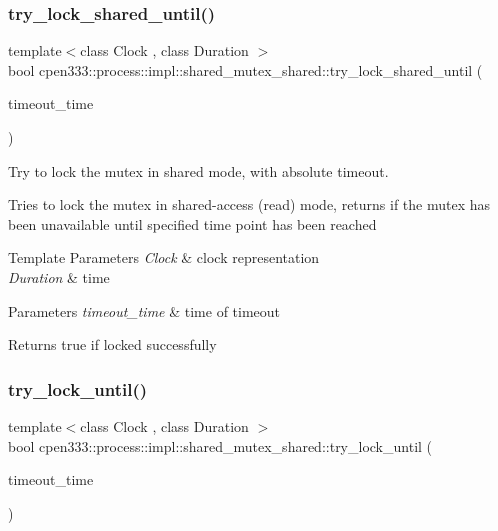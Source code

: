 \subsubsection{\texorpdfstring{try\+\_\+lock\+\_\+shared\+\_\+until()}{try\_lock\_shared\_until()}}
{\footnotesize\ttfamily template$<$class Clock , class Duration $>$ \\
bool cpen333\+::process\+::impl\+::shared\+\_\+mutex\+\_\+shared\+::try\+\_\+lock\+\_\+shared\+\_\+until (\begin{DoxyParamCaption}\item[{const std\+::chrono\+::time\+\_\+point$<$ Clock, Duration $>$ \&}]{timeout\+\_\+time }\end{DoxyParamCaption})\hspace{0.3cm}{\ttfamily [inline]}}



Try to lock the mutex in shared mode, with absolute timeout. 

Tries to lock the mutex in shared-\/access (read) mode, returns if the mutex has been unavailable until specified time point has been reached


\begin{DoxyTemplParams}{Template Parameters}
{\em Clock} & clock representation \\
\hline
{\em Duration} & time \\
\hline
\end{DoxyTemplParams}

\begin{DoxyParams}{Parameters}
{\em timeout\+\_\+time} & time of timeout \\
\hline
\end{DoxyParams}
\begin{DoxyReturn}{Returns}
true if locked successfully 
\end{DoxyReturn}
\mbox{\label{classcpen333_1_1process_1_1impl_1_1shared__mutex__shared_a3aeb0499325e4a073de1877f0a41f2bb}} 
\subsubsection{\texorpdfstring{try\+\_\+lock\+\_\+until()}{try\_lock\_until()}}
{\footnotesize\ttfamily template$<$class Clock , class Duration $>$ \\
bool cpen333\+::process\+::impl\+::shared\+\_\+mutex\+\_\+shared\+::try\+\_\+lock\+\_\+until (\begin{DoxyParamCaption}\item[{const std\+::chrono\+::time\+\_\+point$<$ Clock, Duration $>$ \&}]{timeout\+\_\+time }\end{DoxyParamCaption})\hspace{0.3cm}{\ttfamily [inline]}}



